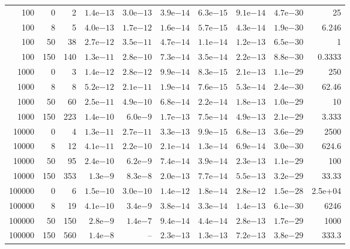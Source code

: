 \begin{tabular}{rrrrrrrrrr}
100 & 0 & 2 & $1.4\mathrm{e}{-13}$ & $3.0\mathrm{e}{-13}$ & $3.9\mathrm{e}{-14}$ & $6.3\mathrm{e}{-15}$ & $9.1\mathrm{e}{-14}$ & $4.7\mathrm{e}{-30}$ & 25\\
100 & 8 & 5 & $4.0\mathrm{e}{-13}$ & $1.7\mathrm{e}{-12}$ & $1.6\mathrm{e}{-14}$ & $5.7\mathrm{e}{-15}$ & $4.3\mathrm{e}{-14}$ & $1.9\mathrm{e}{-30}$ & 6.246\\
100 & 50 & 38 & $2.7\mathrm{e}{-12}$ & $3.5\mathrm{e}{-11}$ & $4.7\mathrm{e}{-14}$ & $1.1\mathrm{e}{-14}$ & $1.2\mathrm{e}{-13}$ & $6.5\mathrm{e}{-30}$ & 1\\
100 & 150 & 140 & $1.3\mathrm{e}{-11}$ & $2.8\mathrm{e}{-10}$ & $7.3\mathrm{e}{-14}$ & $3.5\mathrm{e}{-14}$ & $2.2\mathrm{e}{-13}$ & $8.8\mathrm{e}{-30}$ & 0.3333\\
1000 & 0 & 3 & $1.4\mathrm{e}{-12}$ & $2.8\mathrm{e}{-12}$ & $9.9\mathrm{e}{-14}$ & $8.3\mathrm{e}{-15}$ & $2.1\mathrm{e}{-13}$ & $1.1\mathrm{e}{-29}$ & 250\\
1000 & 8 & 8 & $5.2\mathrm{e}{-12}$ & $2.1\mathrm{e}{-11}$ & $1.9\mathrm{e}{-14}$ & $7.6\mathrm{e}{-15}$ & $5.3\mathrm{e}{-14}$ & $2.4\mathrm{e}{-30}$ & 62.46\\
1000 & 50 & 60 & $2.5\mathrm{e}{-11}$ & $4.9\mathrm{e}{-10}$ & $6.8\mathrm{e}{-14}$ & $2.2\mathrm{e}{-14}$ & $1.8\mathrm{e}{-13}$ & $1.0\mathrm{e}{-29}$ & 10\\
1000 & 150 & 223 & $1.4\mathrm{e}{-10}$ & $6.0\mathrm{e}{-9}$ & $1.7\mathrm{e}{-13}$ & $7.5\mathrm{e}{-14}$ & $4.9\mathrm{e}{-13}$ & $2.1\mathrm{e}{-29}$ & 3.333\\
10000 & 0 & 4 & $1.3\mathrm{e}{-11}$ & $2.7\mathrm{e}{-11}$ & $3.3\mathrm{e}{-13}$ & $9.9\mathrm{e}{-15}$ & $6.8\mathrm{e}{-13}$ & $3.6\mathrm{e}{-29}$ & 2500\\
10000 & 8 & 12 & $4.1\mathrm{e}{-11}$ & $2.2\mathrm{e}{-10}$ & $2.1\mathrm{e}{-14}$ & $1.3\mathrm{e}{-14}$ & $6.9\mathrm{e}{-14}$ & $3.0\mathrm{e}{-30}$ & 624.6\\
10000 & 50 & 95 & $2.4\mathrm{e}{-10}$ & $6.2\mathrm{e}{-9}$ & $7.4\mathrm{e}{-14}$ & $3.9\mathrm{e}{-14}$ & $2.3\mathrm{e}{-13}$ & $1.1\mathrm{e}{-29}$ & 100\\
10000 & 150 & 353 & $1.3\mathrm{e}{-9}$ & $8.3\mathrm{e}{-8}$ & $2.0\mathrm{e}{-13}$ & $7.7\mathrm{e}{-14}$ & $5.5\mathrm{e}{-13}$ & $3.2\mathrm{e}{-29}$ & 33.33\\
100000 & 0 & 6 & $1.5\mathrm{e}{-10}$ & $3.0\mathrm{e}{-10}$ & $1.4\mathrm{e}{-12}$ & $1.8\mathrm{e}{-14}$ & $2.8\mathrm{e}{-12}$ & $1.5\mathrm{e}{-28}$ & 2.5e+04\\
100000 & 8 & 19 & $4.1\mathrm{e}{-10}$ & $3.4\mathrm{e}{-9}$ & $3.8\mathrm{e}{-14}$ & $3.3\mathrm{e}{-14}$ & $1.4\mathrm{e}{-13}$ & $6.1\mathrm{e}{-30}$ & 6246\\
100000 & 50 & 150 & $2.8\mathrm{e}{-9}$ & $1.4\mathrm{e}{-7}$ & $9.4\mathrm{e}{-14}$ & $4.4\mathrm{e}{-14}$ & $2.8\mathrm{e}{-13}$ & $1.7\mathrm{e}{-29}$ & 1000\\
100000 & 150 & 560 & $1.4\mathrm{e}{-8}$ & -- & $2.3\mathrm{e}{-13}$ & $1.3\mathrm{e}{-13}$ & $7.2\mathrm{e}{-13}$ & $3.8\mathrm{e}{-29}$ & 333.3\\
\bottomrule\end{tabular}
